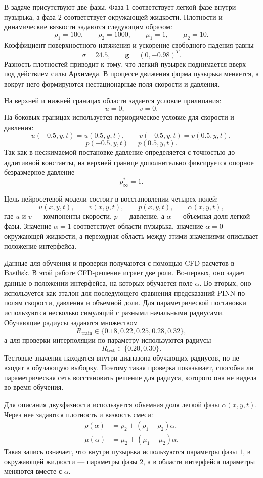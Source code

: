 \documentclass[12pt,a4paper]{article}
\begin{document}
В задаче присутствуют две фазы. Фаза \(1\) соответствует легкой фазе внутри
пузырька, а фаза \(2\) соответствует окружающей жидкости. Плотности и
динамические вязкости задаются следующим образом:
\[
    \rho_1=100,\qquad \rho_2=1000,
    \qquad
    \mu_1=1,\qquad \mu_2=10.
\]
Коэффициент поверхностного натяжения и ускорение свободного падения равны
\[
    \sigma=24.5,
    \qquad
    \mathbf{g}=(0,-0.98)^T.
\]
Разность плотностей приводит к тому, что легкий пузырек поднимается вверх под
действием силы Архимеда. В процессе движения форма пузырька меняется, а вокруг
него формируются нестационарные поля скорости и давления.

На верхней и нижней границах области задается условие прилипания:
\[
    u=0,\qquad v=0.
\]
На боковых границах используется периодическое условие для скорости и давления:
\[
    u(-0.5,y,t)=u(0.5,y,t),
    \qquad
    v(-0.5,y,t)=v(0.5,y,t),
\]
\[
    p(-0.5,y,t)=p(0.5,y,t).
\]
Так как в несжимаемой постановке давление определяется с точностью до
аддитивной константы, на верхней границе дополнительно фиксируется опорное
безразмерное давление
\[
    p_\infty^*=1.
\]

Цель нейросетевой модели состоит в восстановлении четырех полей:
\[
    u(x,y,t),\qquad v(x,y,t),\qquad p(x,y,t),\qquad \alpha(x,y,t),
\]
где \(u\) и \(v\) --- компоненты скорости, \(p\) --- давление, а \(\alpha\) ---
объемная доля легкой фазы. Значение \(\alpha=1\) соответствует области
пузырька, значение \(\alpha=0\) --- окружающей жидкости, а переходная область
между этими значениями описывает положение интерфейса.

Данные для обучения и проверки получаются с помощью CFD-расчетов в Basilisk.
В этой работе CFD-решение играет две роли. Во-первых, оно задает данные о
положении интерфейса, на которых обучается поле \(\alpha\). Во-вторых, оно
используется как эталон для последующего сравнения предсказаний PINN по полям
скорости, давления и объемной доли. Для параметрической постановки используются
несколько симуляций с разными начальными радиусами. Обучающие радиусы задаются
множеством
\[
    R_{\mathrm{train}}\in\{0.18,0.22,0.25,0.28,0.32\},
\]
а для проверки интерполяции по параметру используются радиусы
\[
    R_{\mathrm{test}}\in\{0.20,0.30\}.
\]
Тестовые значения находятся внутри диапазона обучающих радиусов, но не входят в
обучающую выборку. Поэтому такая проверка показывает, способна ли
параметрическая сеть восстановить решение для радиуса, которого она не видела
во время обучения.

Для описания двухфазности используется объемная доля легкой фазы
\(\alpha(x,y,t)\). Через нее задаются плотность и вязкость смеси:
\begin{align}
    \rho(\alpha) &= \rho_2 + (\rho_1-\rho_2)\alpha, \\
    \mu(\alpha) &= \mu_2 + (\mu_1-\mu_2)\alpha.
    \label{eq:chapter2_rho_mu}
\end{align}
Такая запись означает, что внутри пузырька используются параметры фазы \(1\), в
окружающей жидкости --- параметры фазы \(2\), а в области интерфейса параметры
меняются вместе с \(\alpha\).
\end{document}
